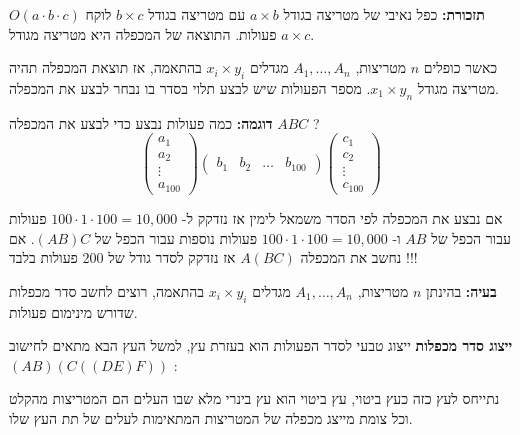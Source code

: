 \textbf{תזכורת:}
כפל נאיבי של מטריצה בגודל 
$a \times b$
עם מטריצה בגודל 
$b \times c$
לוקח 
$O(a \cdot b \cdot c)$
פעולות.
התוצאה של המכפלה היא מטריצה מגודל 
$a \times c$.

כאשר כופלים $n$ מטריצות, 
$A_1,\ldots,A_n$
מגדלים 
$x_i \times y_i$
בהתאמה, אז תוצאת המכפלה תהיה מטריצה מגודל
$x_1 \times y_n$.
מספר הפעולות שיש לבצע תלוי בסדר בו נבחר לבצע את המכפלה.

\textbf{דוגמה:}
כמה פעולות נבצע כדי לבצע את המכפלה
$ABC$
?
$$
\begin{pmatrix}
a_{1}
\\
a_{2}
\\
\vdots
\\
a_{100}
\end{pmatrix}
%
\begin{pmatrix}
b_{1}	&	b_{2} & \dots &  b_{100}
\end{pmatrix}
%
\begin{pmatrix}
c_{1}
\\
c_{2}
\\
\vdots
\\
c_{100}
\end{pmatrix}
$$

אם נבצע את המכפלה לפי הסדר משמאל לימין אז נזדקק ל-%
$100 \cdot 1 \cdot 100 = 10,000$
פעולות עבור הכפל של 
$AB$
ו-%
$100 \cdot 1 \cdot 100 = 10,000$
פעולות נוספות עבור הכפל של
$(AB)C$.
אם נחשב את המכפלה
$A(BC)$
אז נזדקק לסדר גודל של 200 פעולות בלבד !!!

\textbf{בעיה:}
בהינתן $n$ מטריצות, 
$A_1,\ldots,A_n$
מגדלים 
$x_i \times y_i$
בהתאמה, רוצים לחשב סדר מכפלות שדורש מינימום פעולות.

\textbf{ייצוג סדר מכפלות}
ייצוג טבעי לסדר הפעולות הוא בעזרת עץ, למשל העץ הבא מתאים לחישוב
$(AB)(C((DE)F))$
:
\begin{center}
\end{center}

נתייחס לעץ כזה כעץ ביטוי, עץ ביטוי הוא עץ בינרי מלא שבו העלים הם המטריצות מהקלט וכל צומת 
מייצג מכפלה של המטריצות המתאימות לעלים של תת העץ שלו.

